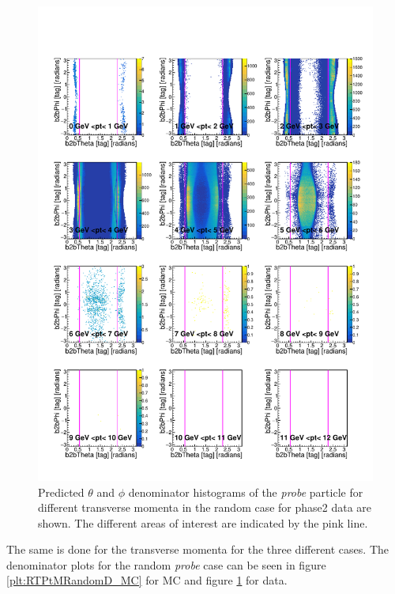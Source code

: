 \documentclass[a4paper,11pt,twosided,final,german,openbib,pdftex,listof=totoc,bibliography=totoc]{scrbook}
\begin{document}
\begin{figure}[h!]
	\includegraphics[width=\textwidth]{Plots/RTPtMRandomD_Data.pdf}
	\caption[Denominator $\theta$, $\phi$ Random Transverse Momentum Data]{Predicted $\theta$ and $\phi$ denominator histograms of the \textit{probe} particle for different transverse momenta in the random case for phase2 data are shown. The different areas of interest are indicated by the pink line.}
	\label{plt:RTPtMRandomD_Data}
\end{figure}


The same is done for the transverse momenta for the three different cases. The denominator plots for the random \textit{probe} case can be seen in figure \ref{plt:RTPtMRandomD_MC} for MC and figure \ref{plt:RTPtMRandomD_Data} for data.
\end{document}
